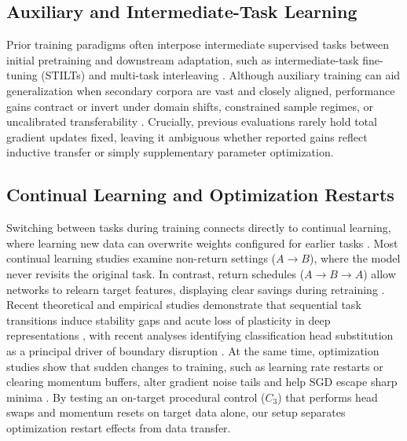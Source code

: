 \documentclass[10pt]{article}
\begin{document}
\subsection{Auxiliary and Intermediate-Task Learning}\label{subsec:related_auxiliary}
Prior training paradigms often interpose intermediate supervised tasks between initial pretraining and downstream adaptation, such as intermediate-task fine-tuning (STILTs) \cite{phang2018stilts,pruksachatkun2020intermediate} and multi-task interleaving \cite{davidson2020sequential,mayo2023multitask}. Although auxiliary training can aid generalization when secondary corpora are vast and closely aligned, performance gains contract or invert under domain shifts, constrained sample regimes, or uncalibrated transferability \cite{yosinski2014transferable,aghajanyan2021muppet,chaves2026benchmarking,ramkumar2024fomo}. Crucially, previous evaluations rarely hold total gradient updates fixed, leaving it ambiguous whether reported gains reflect inductive transfer or simply supplementary parameter optimization.

\subsection{Continual Learning and Optimization Restarts}\label{subsec:related_continual}
Switching between tasks during training connects directly to continual learning, where learning new data can overwrite weights configured for earlier tasks \cite{mccloskey1989catastrophic,french1999catastrophic,kirkpatrick2017overcoming,lopezpaz2017gem,davari2022probing}. Most continual learning studies examine non-return settings ($A \to B$), where the model never revisits the original task. In contrast, return schedules ($A \to B \to A$) allow networks to relearn target features, displaying clear savings during retraining \cite{davidson2020sequential}. Recent theoretical and empirical studies demonstrate that sequential task transitions induce stability gaps and acute loss of plasticity in deep representations \cite{lyle2023plasticity,dohare2024continual}, with recent analyses identifying classification head substitution as a principal driver of boundary disruption \cite{lapacz2025exploring}. At the same time, optimization studies show that sudden changes to training, such as learning rate restarts or clearing momentum buffers, alter gradient noise tails and help SGD escape sharp minima \cite{loshchilov2017sgdr,smith2017cyclical,gurbuzbalaban2023cyclic}. By testing an on-target procedural control ($C_3$) that performs head swaps and momentum resets on target data alone, our setup separates optimization restart effects from data transfer.
\end{document}
